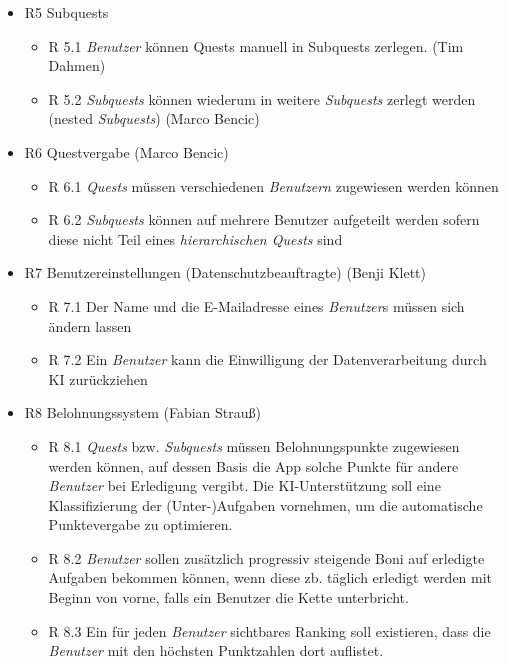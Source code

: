 \documentclass{article}
\begin{document}
\begin{itemize}
\item R5 Subquests
    \begin{itemize}
        \item R 5.1 \textit{Benutzer} können Quests manuell in Subquests zerlegen. (Tim Dahmen) 
        \item R 5.2 \textit{Subquests} können wiederum in weitere \textit{Subquests} zerlegt werden (nested \textit{Subquests}) (Marco Bencic)
    \end{itemize}
\item R6 Questvergabe (Marco Bencic)
    \begin{itemize}
        \item R 6.1 \textit{Quests} müssen verschiedenen \textit{Benutzern} zugewiesen werden können
        \item R 6.2 \textit{Subquests} können auf mehrere Benutzer aufgeteilt werden sofern diese nicht Teil eines \textit{hierarchischen Quests} sind
    \end{itemize}
\item R7 Benutzereinstellungen (Datenschutzbeauftragte) (Benji Klett)
    \begin{itemize}
        \item R 7.1 Der Name und die E-Mailadresse eines \textit{Benutzer}s müssen sich ändern lassen
        \item R 7.2 Ein \textit{Benutzer} kann die Einwilligung der Datenverarbeitung durch KI zurückziehen
    \end{itemize}
\item R8 Belohnungssystem (Fabian Strauß)
    \begin{itemize}
        \item R 8.1 \textit{Quests} bzw. \textit{Subquests} müssen Belohnungspunkte zugewiesen werden können, auf dessen Basis die App solche Punkte für andere \textit{Benutzer} bei Erledigung vergibt. Die KI-Unterstützung soll eine Klassifizierung der (Unter-)Aufgaben vornehmen, um die automatische Punktevergabe zu optimieren.
        \item R 8.2 \textit{Benutzer} sollen zusätzlich progressiv steigende Boni auf erledigte Aufgaben bekommen können, wenn diese zb. täglich erledigt werden mit Beginn von vorne, falls ein Benutzer die Kette unterbricht.
        \item R 8.3 Ein für jeden \textit{Benutzer} sichtbares Ranking soll existieren, dass die \textit{Benutzer} mit den höchsten Punktzahlen dort auflistet.
    \end{itemize}

\end{itemize}
\end{document}
